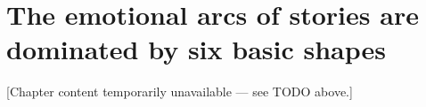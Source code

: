 \chapter{The emotional arcs of stories are dominated by six basic shapes}
\label{chap:emotional-arcs}

[Chapter content temporarily unavailable --- see TODO above.]
